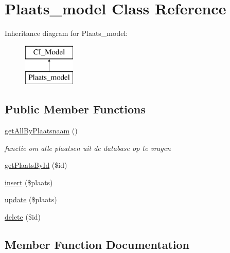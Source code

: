 \hypertarget{class_plaats__model}{}\section{Plaats\+\_\+model Class Reference}
\label{class_plaats__model}
Inheritance diagram for Plaats\+\_\+model\+:\begin{figure}[H]
\begin{center}
\leavevmode
\includegraphics[height=2.000000cm]{class_plaats__model}
\end{center}
\end{figure}
\subsection*{Public Member Functions}
\begin{DoxyCompactItemize}
\item 
\mbox{\label{class_plaats__model_a39dfb5046fda394e79bc2b17c0d8bd1f}} 
\mbox{\hyperlink{class_plaats__model_a39dfb5046fda394e79bc2b17c0d8bd1f}{get\+All\+By\+Plaatsnaam}} ()
\begin{DoxyCompactList}\small\item\em functie om alle plaatsen uit de database op te vragen \end{DoxyCompactList}\item 
\mbox{\hyperlink{class_plaats__model_ad74fde1e8efdd97f181c649e8d869590}{get\+Plaats\+By\+Id}} (\$id)
\item 
\mbox{\hyperlink{class_plaats__model_a708c9f18b63ac2655c6121e63b5ffe7f}{insert}} (\$plaats)
\item 
\mbox{\hyperlink{class_plaats__model_ac03a8dd14ad6cf143baca5f054ab94a1}{update}} (\$plaats)
\item 
\mbox{\hyperlink{class_plaats__model_aed60da9232b9f683e0d9d62897e43cd7}{delete}} (\$id)
\end{DoxyCompactItemize}


\subsection{Member Function Documentation}
\mbox{\label{class_plaats__model_aed60da9232b9f683e0d9d62897e43cd7}} 
